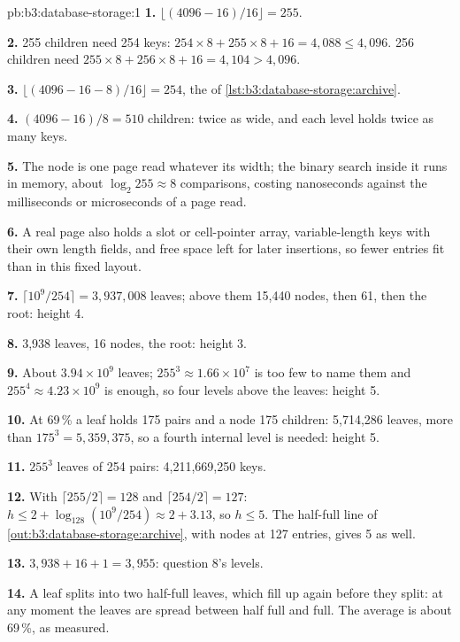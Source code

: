 \begin{solution}{pb:b3:database-storage:1}
\textbf{1.} $\lfloor (4096 - 16)/16 \rfloor = 255$.

\textbf{2.} 255 children need 254 keys: $254 \times 8 + 255 \times 8 + 16 = 4{,}088 \le 4{,}096$. 256 children need $255 \times 8 + 256 \times 8 + 16 = 4{,}104 > 4{,}096$.

\textbf{3.} $\lfloor (4096 - 16 - 8)/16 \rfloor = 254$, the  of \cref{lst:b3:database-storage:archive}.

\textbf{4.} $(4096 - 16)/8 = 510$ children: twice as wide, and each level holds twice as many keys.

\textbf{5.} The node is one page read whatever its width; the binary search inside it runs in memory, about $\log_2 255 \approx 8$ comparisons, costing nanoseconds against the milliseconds or microseconds of a page read.

\textbf{6.} A real page also holds a slot or cell-pointer array, variable-length keys with their own length fields, and free space left for later insertions, so fewer entries fit than in this fixed layout.

\textbf{7.} $\lceil 10^9/254 \rceil = 3{,}937{,}008$ leaves; above them 15,440 nodes, then 61, then the root: height 4.

\textbf{8.} 3,938 leaves, 16 nodes, the root: height 3.

\textbf{9.} About $3.94 \times 10^9$ leaves; $255^3 \approx 1.66 \times 10^7$ is too few to name them and $255^4 \approx 4.23 \times 10^9$ is enough, so four levels above the leaves: height 5.

\textbf{10.} At 69\,\% a leaf holds 175 pairs and a node 175 children: 5,714,286 leaves, more than $175^3 = 5{,}359{,}375$, so a fourth internal level is needed: height 5.

\textbf{11.} $255^3$ leaves of 254 pairs: 4,211,669,250 keys.

\textbf{12.} With $\lceil 255/2 \rceil = 128$ and $\lceil 254/2 \rceil = 127$: $h \le 2 + \log_{128}(10^9/254) \approx 2 + 3.13$, so $h \le 5$. The half-full line of \cref{out:b3:database-storage:archive}, with nodes at 127 entries, gives 5 as well.

\textbf{13.} $3{,}938 + 16 + 1 = 3{,}955$: question 8's levels.

\textbf{14.} A leaf splits into two half-full leaves, which fill up again before they split: at any moment the leaves are spread between half full and full. The average is about 69\,\%, as measured.


\end{solution}

